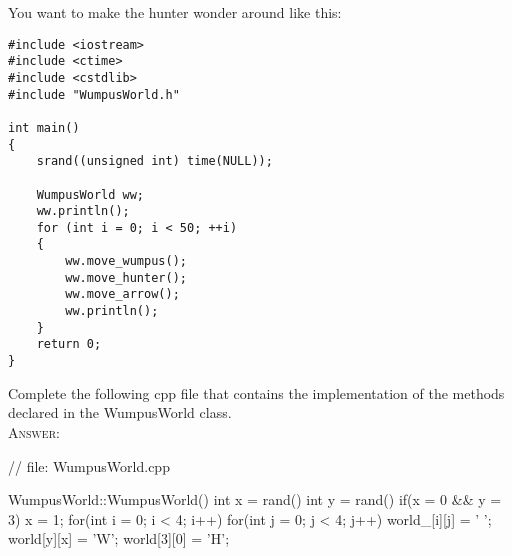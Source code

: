 You want to make the hunter wonder around like this:
\begin{Verbatim}[frame=single,fontsize=\footnotesize]
#include <iostream>
#include <ctime>
#include <cstdlib>
#include "WumpusWorld.h"

int main()
{
    srand((unsigned int) time(NULL));
    
    WumpusWorld ww;
    ww.println();
    for (int i = 0; i < 50; ++i)
    {
        ww.move_wumpus();
        ww.move_hunter();
        ww.move_arrow();
        ww.println();
    }
    return 0;
}
\end{Verbatim}
Complete the following cpp file that contains the implementation
of the methods declared in the WumpusWorld class.
\\
\textsc{Answer:}\vspace{-2mm}
\begin{answercode}
// file: WumpusWorld.cpp

WumpusWorld::WumpusWorld()
{
    int x = rand() %
    int y = rand() %
    if(x = 0 && y = 3)
        x = 1;
    for(int i = 0; i < 4; i++)
    {
        for(int j = 0; j < 4; j++)
        {
            world_[i][j] = ' ';
        }
    }
    world[y][x] = 'W';
    world[3][0] = 'H';
}


\end{answercode}
